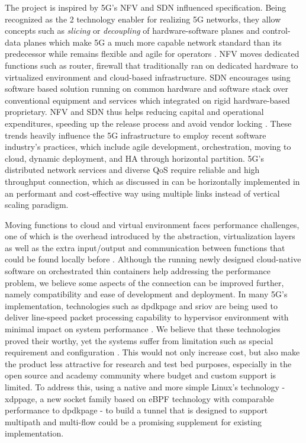 The project is inspired by \ac{5G}'s \ac{NFV} and \ac{SDN} influenced specification.
Being recognized as the 2 technology enabler for realizing 5G networks, they allow concepts such as \textit{slicing} or \textit{decoupling} of hardware-software planes and control-data planes \cite{yousaf_nfv_sdn_key_techno_for_5g2017} \cite{open_baton} which make \ac{5G} a much more capable network standard than its predecessor while remains flexible and agile for operators .
\ac{NFV} moves dedicated functions such as router, firewall that traditionally ran on dedicated hardware to virtualized environment and cloud-based infrastructure.
\ac{SDN} encourages using software based solution running on common hardware and software stack over conventional equipment and services which integrated on rigid hardware-based proprietary.
\ac{NFV} and \ac{SDN} thus helps reducing capital and operational expenditures, speeding up the release process and avoid vendor locking \cite{yousaf_nfv_sdn_key_techno_for_5g2017}\cite{sun_integrating_2015}.
These trends heavily influence the 5G infrastructure to employ recent software industry's practices, which include agile development, orchestration, moving to cloud, dynamic deployment, and \ac{HA} through horizontal partition.
\ac{5G}'s distributed network services and diverse \ac{QoS} require reliable and high throughput connection, which as discussed in  can be horizontally implemented in an performant and cost-effective way using multiple links instead of vertical scaling paradigm.

Moving functions to cloud and virtual environment faces performance challenges, one of which is the overhead introduced by the abstraction, virtualization layers as well as the extra input/output and communication between functions that could be found locally before \cite{yousaf_nfv_sdn_key_techno_for_5g2017}.
Although the running newly designed cloud-native software on orchestrated thin containers help addressing the performance problem, we believe some aspects of the connection can be improved further, namely compatibility and ease of development and deployment.
In many 5G's implementation, technologies such as \ac{dpdkpage} and \ac{sriov} are being used to deliver line-speed packet processing capability to hypervisor environment with minimal impact on system performance \cite{intel_dpdk_perf}\cite{nec_hite_paper_upf_perf}\cite{openstack_sriov}\cite{zte_5g_core_upf_impl}.
We believe that these technologies proved their worthy, yet the systems suffer from limitation such as special requirement and configuration .
This would not only increase cost, but also make the product less attractive for research and test bed purposes, especially in the open source and academy community where budget and custom support is limited.
To address this, using a native and more simple Linux's technology - \ac{xdppage}, a new socket family based on eBPF technology with comparable performance to \ac{dpdkpage} - to build a tunnel that is designed to support multipath and multi-flow could be a promising supplement for existing implementation. 


